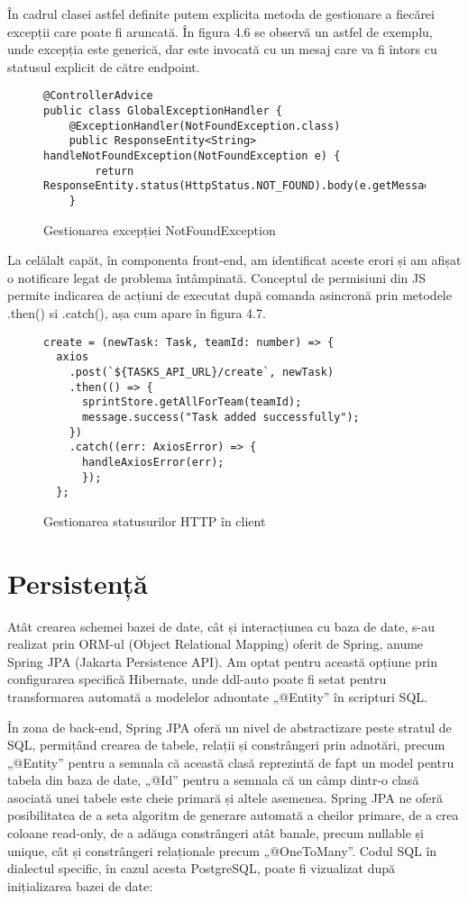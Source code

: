 În cadrul clasei astfel definite putem explicita metoda de gestionare a fiecărei excepții care poate fi aruncată. În figura 4.6 se observă un astfel de exemplu, unde excepția este generică, dar este invocată cu un mesaj care va fi întors cu statusul explicit de către endpoint.

\begin{figure}[H]
	\begin{lstlisting}[frame=single, style=java]
@ControllerAdvice
public class GlobalExceptionHandler {
    @ExceptionHandler(NotFoundException.class)
    public ResponseEntity<String> handleNotFoundException(NotFoundException e) {
        return ResponseEntity.status(HttpStatus.NOT_FOUND).body(e.getMessage());
    }
	\end{lstlisting}
	\label{not-found-exception}
	\caption{Gestionarea excepției NotFoundException}
\end{figure}

La celălalt capăt, în componenta front-end, am identificat aceste erori și am afișat o notificare legat de problema întâmpinată. Conceptul de permisiuni din JS permite indicarea de acțiuni de executat după comanda asincronă prin metodele .then() si .catch(), așa cum apare în figura 4.7.

\begin{figure}[H]
	\begin{lstlisting}[frame=single, style=java]
create = (newTask: Task, teamId: number) => {
  axios
    .post(`${TASKS_API_URL}/create`, newTask)
    .then(() => {
      sprintStore.getAllForTeam(teamId);
      message.success("Task added successfully");
    })
    .catch((err: AxiosError) => {
      handleAxiosError(err);
      });
  };
	\end{lstlisting}
	\label{http-status}
	\caption{Gestionarea statusurilor HTTP în client }
\end{figure}


\section{Persistență}

Atât crearea schemei bazei de date, cât și interacțiunea cu baza de date, s-au realizat prin ORM-ul (Object Relational Mapping) oferit de Spring, anume Spring JPA (Jakarta Persistence API). Am optat pentru această opțiune prin configurarea specifică Hibernate, unde ddl-auto poate fi setat pentru transformarea automată a modelelor adnontate „@Entity” în scripturi SQL.

În zona de back-end, Spring JPA oferă un nivel de abstractizare peste stratul de SQL, permițând crearea de tabele, relații și constrângeri prin adnotări, precum „@Entity” pentru a semnala că această clasă reprezintă de fapt un model pentru tabela din baza de date, „@Id” pentru a semnala că un câmp dintr-o clasă asociată unei tabele este cheie primară și altele asemenea. Spring JPA ne oferă posibilitatea de a seta algoritm de generare automată a cheilor primare, de a crea coloane read-only, de a adăuga constrângeri atât banale, precum nullable și unique, cât și constrângeri relaționale precum „@OneToMany”. Codul SQL în dialectul specific, în cazul acesta PostgreSQL, poate fi vizualizat după inițializarea bazei de date:

